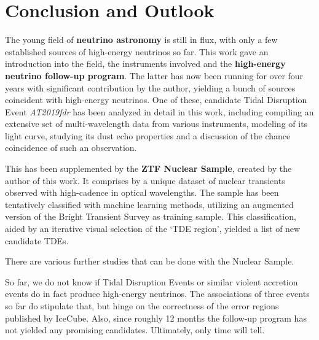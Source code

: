 \chapter{Conclusion and Outlook}\label{conclusion}
The young field of \textbf{neutrino astronomy} is still in flux, with only a few established sources of high-energy neutrinos so far. This work gave an introduction into the field, the instruments involved and the \textbf{high-energy neutrino follow-up program}. The latter has now been running for over four years with significant contribution by the author, yielding a bunch of sources coincident with high-energy neutrinos. One of these, candidate Tidal Disruption Event \textit{AT2019fdr} has been analyzed in detail in this work, including compiling an extensive set of multi-wavelength data from various instruments, modeling of its light curve, studying its dust echo properties and a discussion of the chance coincidence of such an observation.

This has been supplemented by the \textbf{ZTF Nuclear Sample}, created by the author of this work. It comprises by a unique dataset of nuclear transients observed with high-cadence in optical wavelengths. The sample has been tentatively classified with machine learning methods, utilizing an augmented version of the Bright Transient Survey as training sample. This classification, aided by an iterative visual selection of the `TDE region', yielded a list of new candidate TDEs.

There are various further studies that can be done with the Nuclear Sample.

So far, we do not know if Tidal Disruption Events or similar violent accretion events do in fact produce high-energy neutrinos. The associations of three events so far do stipulate that, but hinge on the correctness of the error regions published by IceCube. Also, since roughly 12 months the follow-up program has not yielded any promising candidates. Ultimately, only time will tell.